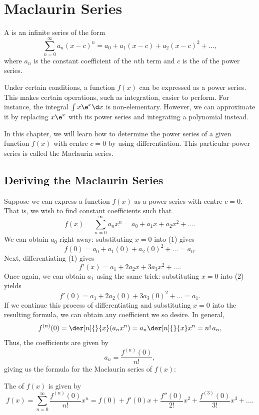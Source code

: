 \chapter{Maclaurin Series}\label{chap:Maclaurin-Series}

\begin{definition}
    A  is an infinite series of the form \[\sum_{n=0}^\infty a_n (x-c)^n = a_0 + a_1 (x-c) + a_2 (x-c)^2 + \dots,\] where $a_n$ is the constant coefficient of the $n$th term and $c$ is the  of the power series.
\end{definition}

Under certain conditions, a function $f(x)$ can be expressed as a power series. This makes certain operations, such as integration, easier to perform. For instance, the integral $\int x\e^x \d x$ is non-elementary. However, we can approximate it by replacing $x\e^x$ with its power series and integrating a polynomial instead.

In this chapter, we will learn how to determine the power series of a given function $f(x)$ with centre $c = 0$ by using differentiation. This particular power series is called the Maclaurin series.

\section{Deriving the Maclaurin Series}

Suppose we can express a function $f(x)$ as a power series with centre $c = 0$. That is, we wish to find constant coefficients such that \[f(x) = \sum_{n=0}^\infty a_n x^n = a_0 + a_1 x + a_2 x^2 + \dots. \tag{1}\] We can obtain $a_0$ right away: substituting $x = 0$ into (1) gives \[f(0) = a_0 + a_1 (0) + a_2 (0)^2 + \dots = a_0.\] Next, differentiating (1) gives \[f'(x) = a_1 + 2a_2 x + 3a_3 x^2 + \dots. \tag{2}\] Once again, we can obtain $a_1$ using the same trick: substituting $x = 0$ into (2) yields \[f'(0) = a_1 + 2a_2 (0) + 3a_3 (0)^2 + \dots = a_1.\] If we continue this process of differentiating and substituting $x = 0$ into the resulting formula, we can obtain any coefficient we so desire. In general, \[f^{(n)}(0) = \der[n]{}{x} (a_n x^n) = a_n \der[n]{}{x} x^n = n! \, a_n,\] Thus, the coefficients are given by \[a_n = \frac{f^{(n)}(0)}{n!},\] giving us the formula for the Maclaurin series of $f(x)$:

\begin{definition}
    The  of $f(x)$ is given by \[f(x) = \sum_{n=0}^\infty \frac{f^{(n)}(0)}{n!} x^n = f(0) + f'(0) x + \frac{f''(0)}{2!} x^2 + \frac{f^{(3)}(0)}{3!} x^3 + \dots.\]
\end{definition}

